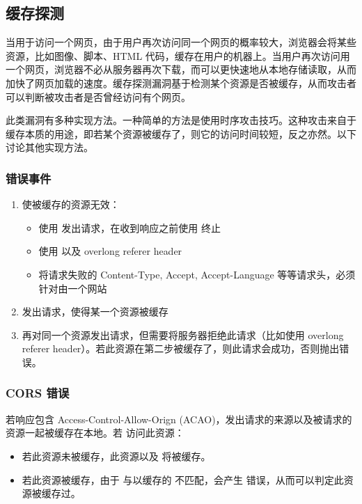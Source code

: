 \subsection{缓存探测}\label{sec:cache}

当用于访问一个网页，由于用户再次访问同一个网页的概率较大，浏览器会将某些资源，比如图像、脚本、HTML 代码，缓存在用户的机器上。当用户再次访问用一个网页，浏览器不必从服务器再次下载，而可以更快速地从本地存储读取，从而加快了网页加载的速度。缓存探测漏洞基于检测某个资源是否被缓存，从而攻击者可以判断被攻击者是否曾经访问有个网页。

此类漏洞有多种实现方法。一种简单的方法是使用时序攻击技巧。这种攻击来自于缓存本质的用途，即若某个资源被缓存了，则它的访问时间较短，反之亦然。以下讨论其他实现方法。

\subsubsection{错误事件 \cite{cachetimer}}

\begin{enumerate}
    \item 使被缓存的资源无效：
    \begin{itemize}
        \item 使用  发出请求，在收到响应之前使用  终止
        \item 使用  以及 overlong referer header
        \item 将请求失败的 Content-Type, Accept, Accept-Language 等等请求头，必须针对由一个网站
    \end{itemize}
    \item 发出请求，使得某一个资源被缓存
    \item 再对同一个资源发出请求，但需要将服务器拒绝此请求（比如使用 overlong referer header）。若此资源在第二步被缓存了，则此请求会成功，否则抛出错误。
\end{enumerate}

\subsubsection{CORS 错误 \cite{cachecors}}

若响应包含 Access-Control-Allow-Orign (ACAO)，发出请求的来源以及被请求的资源一起被缓存在本地。若  访问此资源：

\begin{itemize}
    \item 若此资源未被缓存，此资源以及  将被缓存。
    \item 若此资源被缓存，由于  与以缓存的  不匹配，会产生  错误，从而可以判定此资源被缓存过。
\end{itemize}


